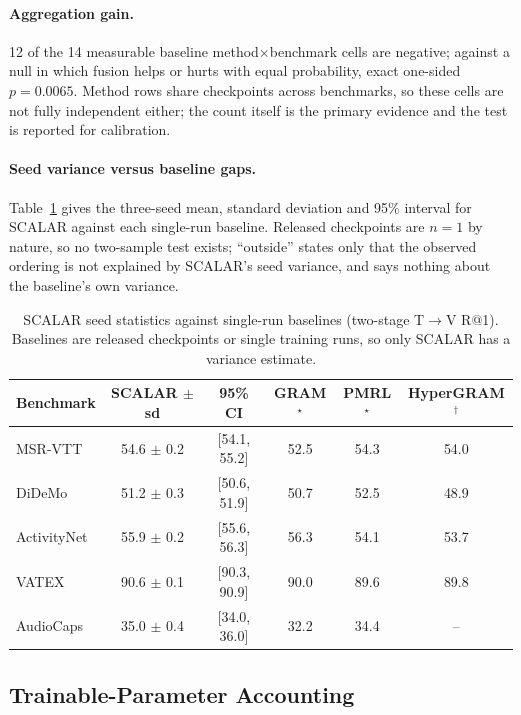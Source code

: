 \documentclass[10pt,twocolumn,letterpaper]{article}
\newcommand{\ours}{SCALAR}
\begin{document}
\paragraph{Aggregation gain.}
12 of the 14 measurable baseline method$\times$benchmark cells are negative;
against a null in which fusion helps or hurts with equal probability, exact
one-sided $p = 0.0065$. Method rows share checkpoints across benchmarks, so
these cells are not fully independent either; the count itself is the primary
evidence and the test is reported for calibration.

\paragraph{Seed variance versus baseline gaps.}
Table~\ref{tab:seedci} gives the three-seed mean, standard deviation and 95\%
interval for \ours{} against each single-run baseline. Released checkpoints are
$n{=}1$ by nature, so no two-sample test exists; ``outside'' states only that
the observed ordering is not explained by \ours{}'s seed variance, and says
nothing about the baseline's own variance.

\begin{table}[t]
\centering
\caption{\ours{} seed statistics against single-run baselines (two-stage
T$\rightarrow$V R@1). Baselines are released checkpoints or single training
runs, so only \ours{} has a variance estimate.}
\label{tab:seedci}
\small
\setlength{\tabcolsep}{3pt}
\begin{tabular}{lccccc}
\toprule
Benchmark & \ours{} $\pm$ sd & 95\% CI & GRAM$^{\star}$ & PMRL$^{\star}$ & HyperGRAM$^{\dagger}$ \\
\midrule
MSR-VTT & 54.6 $\pm$ 0.2 & [54.1, 55.2] & 52.5 & 54.3 & 54.0 \\
DiDeMo & 51.2 $\pm$ 0.3 & [50.6, 51.9] & 50.7 & 52.5 & 48.9 \\
ActivityNet & 55.9 $\pm$ 0.2 & [55.6, 56.3] & 56.3 & 54.1 & 53.7 \\
VATEX & 90.6 $\pm$ 0.1 & [90.3, 90.9] & 90.0 & 89.6 & 89.8 \\
AudioCaps & 35.0 $\pm$ 0.4 & [34.0, 36.0] & 32.2 & 34.4 & -- \\
\bottomrule
\end{tabular}
\end{table}

\subsection{Trainable-Parameter Accounting}
\label{sec:params}
\end{document}
